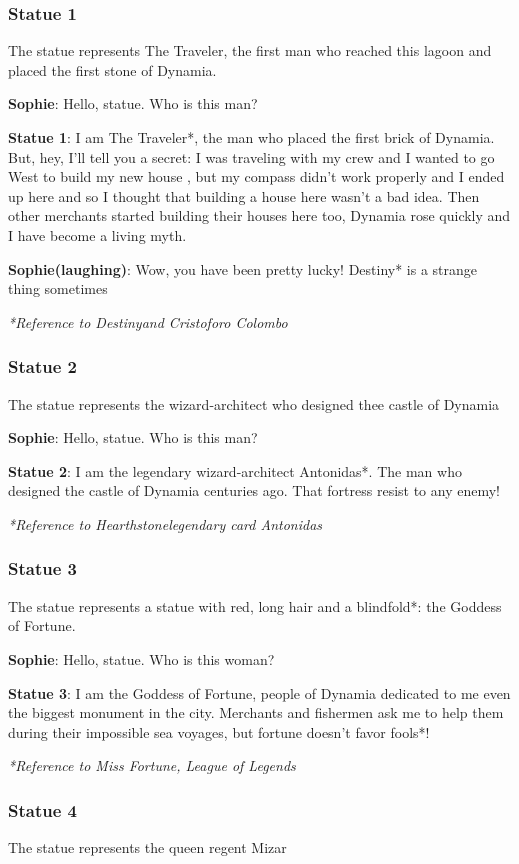 \subsubsection*{Statue 1}
The statue represents The Traveler, the first man who reached this lagoon and placed the first stone of Dynamia.

\textbf{Sophie}: Hello, statue. Who is this man?

\textbf{Statue 1}: I am The Traveler*, the man who placed the first brick of Dynamia. But, hey, I'll tell you a secret: I was traveling with my crew and I wanted to go West to build my new house , but my compass didn't work properly and I ended up here and so I thought that building a house here wasn't a bad idea. Then other merchants started building their houses here too, Dynamia rose quickly and I have become a living myth.

\textbf{Sophie(laughing)}: Wow, you have been pretty lucky! Destiny* is a strange thing sometimes

\textit{*Reference to Destiny\texttrademark and Cristoforo Colombo}
\subsubsection*{Statue 2}
The statue represents the wizard-architect who designed thee castle of Dynamia

\textbf{Sophie}: Hello, statue. Who is this man?

\textbf{Statue 2}: I am the legendary wizard-architect Antonidas*. The man who designed the castle of Dynamia centuries ago. That fortress resist to any enemy!


\textit{*Reference to Hearthstone\texttrademark legendary card Antonidas}
\subsubsection*{Statue 3}
The statue represents a statue with red, long hair and a blindfold*: the Goddess of Fortune.

\textbf{Sophie}: Hello, statue. Who is this woman?

\textbf{Statue 3}: I am the Goddess of Fortune, people of Dynamia dedicated to me even the biggest monument in the city. Merchants and fishermen ask me to help them during their impossible sea voyages, but fortune doesn't favor fools*!

\textit{*Reference to Miss Fortune, League of Legends\texttrademark}
\subsubsection*{Statue 4}
The statue represents the queen regent Mizar

